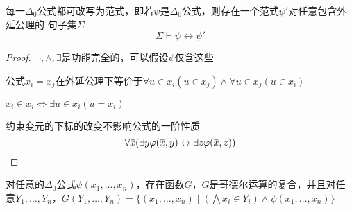 \documentclass[11pt]{article}
\begin{document}
\begin{lemma}[]
每一\(\Delta_0\)公式都可改写为范式，即若\(\psi\)是\(\Delta_0\)公式，则存在一个范式\(\psi'\)对任意包含外延公理的
句子集\(\Sigma\)
\begin{equation*}
\Sigma\vdash\psi\leftrightarrow\psi'
\end{equation*}
\end{lemma}

\begin{proof}
\(\neg,\wedge,\exists\)是功能完全的，可以假设\(\psi\)仅含这些

公式\(x_i=x_j\)在外延公理下等价于\(\forall u\in x_i(u\in x_j)\wedge\forall u\in x_j(u\in x_i)\)

\(x_i\in x_i\Leftrightarrow\exists u\in x_i(u=x_i)\)

约束变元的下标的改变不影响公式的一阶性质
\begin{equation*}
\forall\barx(\exists y\varphi(\barx,y)\leftrightarrow\exists z\varphi(\barx,z))
\end{equation*}
\end{proof}

\begin{theorem}[]
对任意的\(\Delta_0\)公式\(\psi(x_1,\dots,x_n)\)，存在函数\(G\)，\(G\)是哥德尔运算的复合，并且对任
意\(Y_1,\dots,Y_n\)，\(G(Y_1,\dots,Y_n)=\{(x_1,\dots,x_n)\mid(\bigwedge x_i\in Y_i)\wedge\psi(x_1,\dots,x_n)\}\)
\end{theorem}
\end{document}
